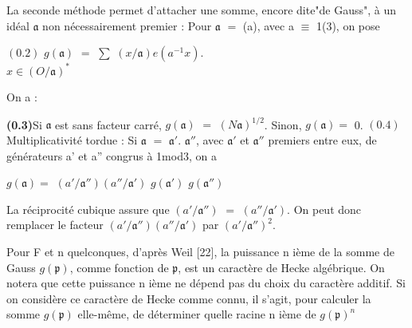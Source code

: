 \documentclass[10pt,a4paper]{article}
\begin{document}
\par La seconde méthode permet d'attacher une somme, encore dite"de Gauss", à un idéal $\mathfrak{a}$ non nécessairement premier : Pour $\mathfrak{a}$ $=$ (a), avec a $\equiv{}$ 1(3), on pose\par
\par\smallskip\begin{center}\begin{minipage}{0.96\textwidth}\centering
$(0.2)$ $g(\mathfrak{a})$ $=$ $\sum{}$ $(x/\mathfrak{a})e(a^{-1}x)$. \\ $x\in{}(O/\mathfrak{a})^*$
\end{minipage}\end{center}\smallskip
\par On a :\par
\par\noindent\textbf{(0.3)}\quad Si $\mathfrak{a}$ est sans facteur carré, $g(\mathfrak{a})$ $=$ $(N\mathfrak{a})^{1/2}$. Sinon, $g(\mathfrak{a})=$ 0. $(0.4)$ Multiplicativité tordue : Si $\mathfrak{a}$ $=$ $\mathfrak{a}'$. $\mathfrak{a}''$, avec $\mathfrak{a}'$ et $\mathfrak{a}''$ premiers entre eux, de générateurs a' et a'' congrus à 1mod3, on a\par
\par\smallskip\begin{center}\begin{minipage}{0.96\textwidth}\centering
$g(\mathfrak{a})=$ $(a'/\mathfrak{a}'')(a''/\mathfrak{a}')$ $g(\mathfrak{a}')$ $g(\mathfrak{a}'')$
\end{minipage}\end{center}\smallskip
\par La réciprocité cubique assure que $(a'/\mathfrak{a}'')$ $=$ $(a''/\mathfrak{a}')$. On peut donc remplacer le facteur $(a'/\mathfrak{a}'')(a''/\mathfrak{a}')$ par $(a'/\mathfrak{a}'')^2$.\par
\par Pour F et n quelconques, d'après Weil [22], la puissance n ième de la somme de Gauss $g(\mathfrak{p})$, comme fonction de $\mathfrak{p}$, est un caractère de Hecke algébrique. On notera que cette puissance n ième ne dépend pas du choix du caractère additif. Si on considère ce caractère de Hecke comme connu, il s'agit, pour calculer la somme $g(\mathfrak{p})$ elle-même, de déterminer quelle racine n ième de $g(\mathfrak{p})^n$\par
\end{document}

